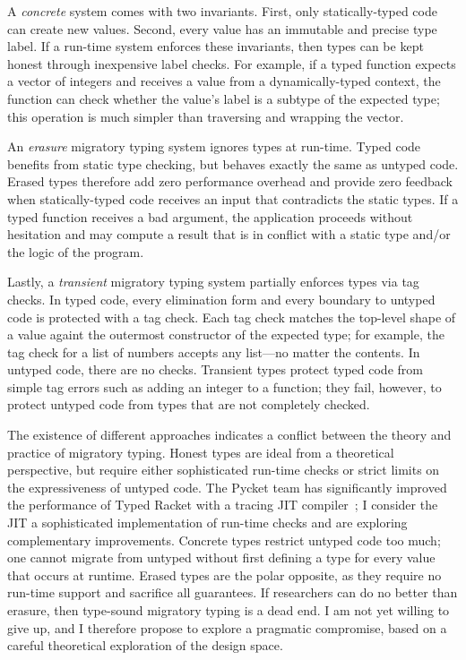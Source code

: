 A \emph{concrete}\/ system comes with two invariants.
First, only statically-typed code can create new values.
Second, every value has an immutable and precise type label.
If a run-time system enforces these invariants, then types can be kept honest
 through inexpensive label checks.
For example, if a typed function expects a vector of integers and receives
 a value from a dynamically-typed context, the function can check whether the
 value's label is a subtype of the expected type; this operation is much
 simpler than traversing and wrapping the vector.

An \emph{erasure}\/ migratory typing system ignores types at run-time.
Typed code benefits from static type checking, but behaves exactly the same
 as untyped code.
Erased types therefore add zero performance overhead and provide zero feedback
 when statically-typed code receives an input that contradicts the static
 types.
If a typed function receives a bad argument, the application proceeds without
 hesitation and may compute a result that is in conflict with a
 static type and/or the logic of the program.

Lastly, a \emph{transient}\/ migratory typing system partially enforces types
 via tag checks.
In typed code, every elimination form and every boundary to untyped code
 is protected with a tag check.
Each tag check matches the top-level shape of a value againt the outermost
 constructor of the expected type; for example, the tag check for a
 list of numbers accepts any list---no matter the contents.
In untyped code, there are no checks.
Transient types protect typed code from simple
 tag errors such as adding an integer to a function; they fail, however,
 to protect untyped code from types that are not completely checked.

The existence of different approaches indicates a conflict between the theory
 and practice of migratory typing.
Honest types are ideal from a theoretical perspective, but require either
 sophisticated run-time checks or strict limits on the expressiveness of
 untyped code.
The Pycket team has significantly improved the performance
 of Typed Racket with a tracing JIT compiler~\cite{bbst-oopsla-2017};
 I consider the JIT a sophisticated implementation of run-time checks
 and are exploring complementary improvements.
Concrete types restrict untyped code too much; one cannot migrate from untyped
 without first defining a type for every value that occurs at runtime.
Erased types are the polar opposite, as they require no run-time support
 and sacrifice all guarantees.
If researchers can do no better than erasure, then
 type-sound migratory typing is a dead end.
I am not yet willing to give up, and I therefore propose to explore a pragmatic
 compromise, based on a careful theoretical exploration of the design space.
